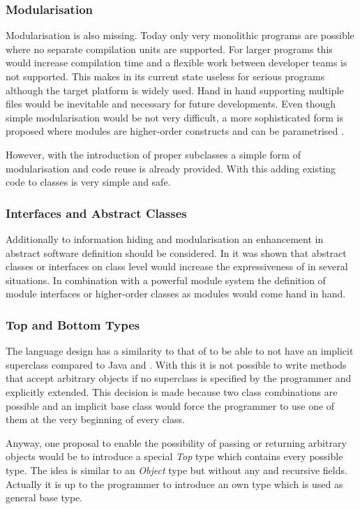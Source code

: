 \subsubsection{Modularisation}
Modularisation is also missing. Today only very monolithic programs
are possible where no separate compilation units are supported. For larger
programs this would increase compilation time and a flexible work between
developer teams is not supported. This makes \ooplss in its current state
useless for serious programs although the target platform is widely
used. Hand in hand supporting multiple files would be inevitable and
necessary for future developments. Even though simple modularisation would be
not very difficult, a more sophisticated form is proposed where modules are
higher-order constructs and can be parametrised \cite{dreyer_type_2003}.

However, with the introduction of proper subclasses a simple form of
modularisation and code reuse is already provided. With this adding
existing code to classes is very simple and safe.

\subsubsection{Interfaces and Abstract Classes}
Additionally to information hiding and modularisation an
enhancement in abstract software definition should be considered. In
 it was shown that abstract classes or
interfaces on class level would increase the expressiveness of \ooplss
in several situations. In combination with a powerful module system
the definition of module interfaces or higher-order classes as modules
would come hand in hand.

\subsubsection{Top and Bottom Types}
The language design has a similarity to that of \cpp to be able to
not have an implicit superclass compared to Java and \cs. With this
it is not possible to write methods that accept
arbitrary objects if no superclass is specified by the programmer and explicitly
extended. This decision is made because two class combinations are
possible and an implicit base class would force the programmer to use one
of them at the very beginning of every class.

Anyway, one proposal to enable the possibility of passing or
returning arbitrary objects would be to introduce a special \emph{Top}
type which contains every possible type. The idea is similar to an
\emph{Object} type but without any \mytype and recursive fields. Actually
it is up to the programmer to introduce an own type which is used
as general base type.

